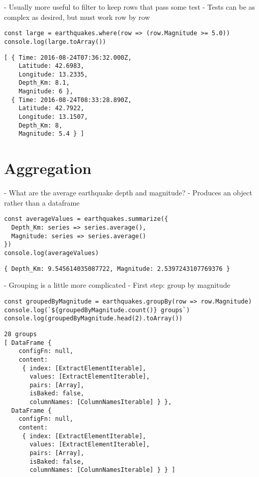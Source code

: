 -   Usually more useful to filter to keep rows that pass some test
    -   Tests can be as complex as desired, but must work row by row

\begin{verbatim}
const large = earthquakes.where(row => (row.Magnitude >= 5.0))
console.log(large.toArray())
\end{verbatim}

\begin{verbatim}
[ { Time: 2016-08-24T07:36:32.000Z,
    Latitude: 42.6983,
    Longitude: 13.2335,
    Depth_Km: 8.1,
    Magnitude: 6 },
  { Time: 2016-08-24T08:33:28.890Z,
    Latitude: 42.7922,
    Longitude: 13.1507,
    Depth_Km: 8,
    Magnitude: 5.4 } ]
\end{verbatim}
    
\section{Aggregation}\label{s:dataforge-aggregate}

-   What are the average earthquake depth and magnitude?
    -   Produces an object rather than a dataframe

\begin{verbatim}
const averageValues = earthquakes.summarize({
  Depth_Km: series => series.average(),
  Magnitude: series => series.average()
})
console.log(averageValues)
\end{verbatim}

\begin{verbatim}
{ Depth_Km: 9.545614035087722, Magnitude: 2.5397243107769376 }
\end{verbatim}

-   Grouping is a little more complicated
-   First step: group by magnitude

\begin{verbatim}
const groupedByMagnitude = earthquakes.groupBy(row => row.Magnitude)
console.log(`${groupedByMagnitude.count()} groups`)
console.log(groupedByMagnitude.head(2).toArray())
\end{verbatim}

\begin{verbatim}
28 groups
[ DataFrame {
    configFn: null,
    content:
     { index: [ExtractElementIterable],
       values: [ExtractElementIterable],
       pairs: [Array],
       isBaked: false,
       columnNames: [ColumnNamesIterable] } },
  DataFrame {
    configFn: null,
    content:
     { index: [ExtractElementIterable],
       values: [ExtractElementIterable],
       pairs: [Array],
       isBaked: false,
       columnNames: [ColumnNamesIterable] } } ]
\end{verbatim}

